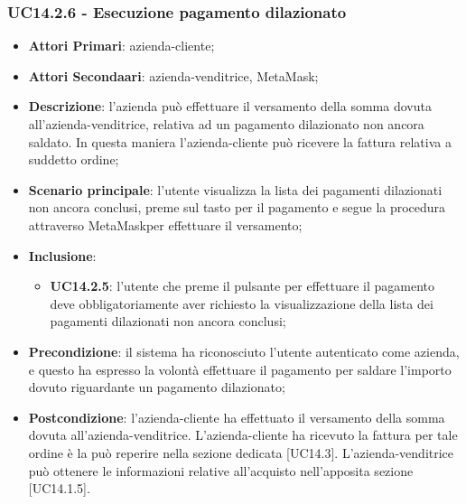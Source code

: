 \subsubsection{UC14.2.6 - Esecuzione pagamento dilazionato}
\begin{itemize}
	\item \textbf{Attori Primari}: azienda-cliente;
	\item \textbf{Attori Secondaari}: azienda-venditrice, MetaMask\glo;
	\item \textbf{Descrizione}: l'azienda può effettuare il versamento della somma dovuta all'azienda-venditrice, relativa ad un pagamento dilazionato non ancora saldato. In questa maniera l'azienda-cliente può ricevere la fattura relativa a suddetto ordine;
	\item \textbf{Scenario principale}: l'utente visualizza la lista dei pagamenti dilazionati non ancora conclusi, preme sul tasto per il pagamento e segue la procedura attraverso MetaMask\glosp per effettuare il versamento;
	\item \textbf{Inclusione}: 
	\begin{itemize}
		\item \textbf{UC14.2.5}: l'utente che preme il pulsante per effettuare il pagamento deve obbligatoriamente aver richiesto la visualizzazione della lista dei pagamenti dilazionati non ancora conclusi;
	\end{itemize}
	\item \textbf{Precondizione}: il sistema ha riconosciuto l'utente autenticato come azienda, e questo ha espresso la volontà effettuare il pagamento per saldare l'importo dovuto riguardante un pagamento dilazionato;
	\item \textbf{Postcondizione}: l'azienda-cliente ha effettuato il versamento della somma dovuta all'azienda-venditrice. L'azienda-cliente ha ricevuto la fattura per tale ordine è la può reperire nella sezione dedicata [UC14.3]. L'azienda-venditrice può ottenere le informazioni relative all'acquisto nell'apposita sezione [UC14.1.5].
\end{itemize}



